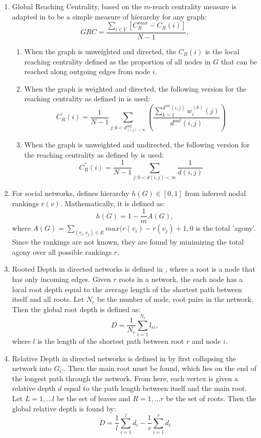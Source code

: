 \documentclass[3p,times]{elsarticle}
\begin{document}
\begin{enumerate}
	\item Global Reaching Centrality, based on the $m$-reach centrality measure is adapted in \cite{GRC} to be a simple measure of hierarchy for any graph:
	$$
	GRC=\frac{\sum_{i\in V}{[C_R^{max}-C_R(i)]}}{N-1},
	$$
	\begin{enumerate}
		\item When the graph is unweighted and directed, the $C_R(i)$ is the local reaching centrality defined as the proportion of all nodes in $G$ that can be reached along outgoing edges from node $i$.
		
		\item When the graph is weighted and directed, the following version for the reaching centrality as defined in \cite{GRC} is used:
		$$
		C_{R}^{'}(i)=\frac{1}{N-1}\sum_{j: 0<d^{out}_{(i,j)<\infty}}{( \frac{\sum_{k=1}^{d^{out}(i,j)} {w_{i}^{(k)} (j) } }{d^{out}(i,j)} )}
		$$
		
		\item When the graph is unweighted and undirected, the following version for the reaching centrality as defined by \cite{GRC} is used:
		$$
		C_{R}^{''}(i)=\frac{1}{N-1}\sum_{j:0<d(i,j)<\infty}{\frac{1}{d(i,j)}}
		$$
	\end{enumerate}
	\item For social networks, \cite{online} defines hierarchy $h(G)\in[0,1]$ from inferred nodal rankings $r(v)$. Mathematically, it is defined as:
	$$
	h(G)=1-\frac{1}{m}A(G),
	$$ 
	where $A(G)=\sum_{(v_i,v_j)\in E} {max(r(v_i)-r(v_j)+1,0}$ is the total 'agony'. Since the rankings are not known, they are found by minimizing the total agony over all possible rankings $r$.
	
	\item Rooted Depth in directed networks is defined in \cite{depth}, where a root is a node that has only incoming edges. Given $r$ roots in a network, the each node has a local root depth equal to the average length of the shortest path between itself and all roots. Let $N_{r}$ be the number of node, root pairs in the network. Then the global root depth is defined as:
	$$
	D=\frac{1}{N_{r}}\sum_{i=1}^{N_r}{l_{ri}},	
	$$
	where $l$ is the length of the shortest path between root $r$ and node $i$.
	
	\item Relative Depth in directed networks is defined in \cite{depth} by first collapsing the network into $G_C$. Then the main root must be found, which lies on the end of the longest path through the network. From here, each vertex is given a relative depth $d$ equal to the path length between itself and the main root. Let $L=1,...l$ be the set of leaves and $R=1,...r$ be the set of roots. Then the global relative depth is found by:
	$$
	D=\frac{1}{l}\sum_{i=1}^{l}{d_i}-\frac{1}{r}\sum_{i=1}^{r}{d_i}
	$$
	

\end{enumerate}
\end{document}
